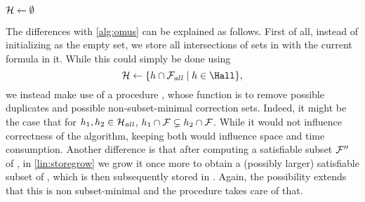 \begin{algorithm}[ht]
  \DontPrintSemicolon
  $\mathcal{H}   \gets \emptyset$ \; %
  
    \caption{$\omusinc(\formula,f)$ }
  \label{alg:omus-inc}
\end{algorithm}


The differences with \cref{alg:omus} can be explained as follows.
First of all, instead of initializing \setstohit as the empty set, we store all intersections of sets in \setstohitall with the current formula in it. 
While this could simply be done using 
\[\setstohit \gets \{h\cap \fall\mid h\in \Hall\},\]
we instead make use of a procedure \store, whose function is to remove possible duplicates and possible non-subset-minimal correction sets. 
Indeed, it might be the case that for $h_1,h_2\in\mathcal{H}_\mathit{all} $, $h_1\cap\mathcal{F}  \subsetneq h_2\cap\mathcal{F} $. 
While it would not influence correctness of the algorithm, keeping both would influence space and time consumption.
Another difference is that after computing a satisfiable subset $\mathcal{F} ''$ of \formula, in \cref{lin:storegrow} we grow it once more to obtain a (possibly larger) satisfiable subset of \fall, which is then subsequently stored in \Hall. Again, the possibility extends that this is non subset-minimal and the \store procedure takes care of that.


